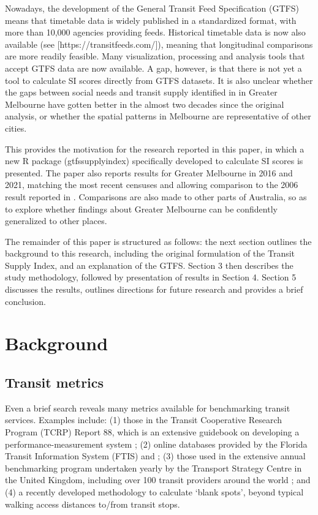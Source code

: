 \documentclass[preprint, 3p,
authoryear]{elsarticle} %
\begin{document}
Nowadays, the development of the General Transit Feed Specification
(GTFS) means that timetable data is widely published in a standardized
format, with more than 10,000 agencies providing feeds\citep{GTFS}.
Historical timetable data is now also available (see
{[}https://transitfeeds.com/{]}), meaning that longitudinal comparisons
are more readily feasible. Many visualization, processing and analysis
tools that accept GTFS data are now available. A gap, however, is that
there is not yet a tool to calculate SI scores directly from GTFS
datasets. It is also unclear whether the gaps between social needs and
transit supply identified in \citet{currie2010identifying} in Greater
Melbourne have gotten better in the almost two decades since the
original analysis, or whether the spatial patterns in Melbourne are
representative of other cities.

This provides the motivation for the research reported in this paper, in
which a new R package (gtfssupplyindex) specifically developed to
calculate SI scores is presented. The paper also reports results for
Greater Melbourne in 2016 and 2021, matching the most recent censuses
and allowing comparison to the 2006 result reported in
\citet{currie2010identifying}. Comparisons are also made to other parts
of Australia, so as to explore whether findings about Greater Melbourne
can be confidently generalized to other places.

The remainder of this paper is structured as follows: the next section
outlines the background to this research, including the original
formulation of the Transit Supply Index, and an explanation of the GTFS.
Section 3 then describes the study methodology, followed by presentation
of results in Section 4. Section 5 discusses the results, outlines
directions for future research and provides a brief conclusion.

\hypertarget{background}{%
\section{Background}\label{background}}

\hypertarget{transit-metrics}{%
\subsection{Transit metrics}\label{transit-metrics}}

Even a brief search reveals many metrics available for benchmarking
transit services. Examples include: (1) those in the Transit Cooperative
Research Program (TCRP) Report 88, which is an extensive guidebook on
developing a performance-measurement system \citep{Ryus:2003aa}; (2)
online databases provided by the Florida Transit Information System
(FTIS) \citep{Florida-Transit-Information-System:2018aa} and
\citet{UITP:2015aa}; (3) those used in the extensive annual benchmarking
program undertaken yearly by the Transport Strategy Centre in the United
Kingdom, including over 100 transit providers around the world
\citep{Imperial-College-London:2023aa}; and (4) a recently developed
methodology to calculate `blank spots', beyond typical walking access
distances to/from transit stops\citep{AlamriSultan2023GAoA}.
\end{document}
